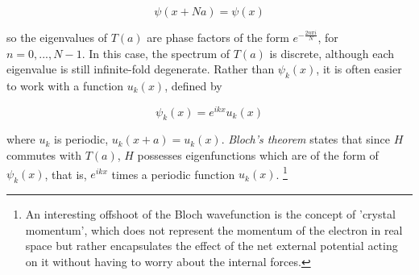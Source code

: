 \begin{equation*}
    \psi(x+Na) = \psi(x)
\end{equation*}

so the eigenvalues of $T(a)$ are phase factors of the form $e^{-\frac{2n\pi i}{N}}$, for $n = 0,..., N-1$. In this case, the spectrum of $T(a)$ is discrete, although each eigenvalue is still infinite-fold degenerate. Rather than $\psi_{k}(x)$, it is often easier to work with a function $u_{k}(x)$, defined by

\begin{equation}
    \psi_{k}(x) = e^{ikx} u_{k}(x)
\end{equation}

where $u_{k}$ is periodic, $u_{k}(x+a) = u_{k}(x)$. \textit{Bloch's theorem} states that since $H$ commutes with $T(a)$, $H$ possesses eigenfunctions which are of the form of $\psi_{k}(x)$, that is, $e^{ikx}$ times a periodic function $u_{k}(x)$. \footnote{An interesting offshoot of the Bloch wavefunction is the concept of 'crystal momentum', which does not represent the momentum of the electron in real space but rather encapsulates the effect of the net external potential acting on it without having to worry about the internal forces.}